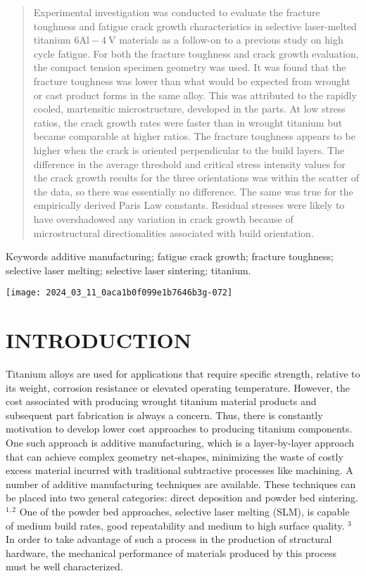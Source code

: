 \documentclass[10pt]{article}
\begin{document}
\begin{abstract}
Experimental investigation was conducted to evaluate the fracture toughness and fatigue crack growth characteristics in selective laser-melted titanium $6 \mathrm{Al}-4 \mathrm{~V}$ materials as a follow-on to a previous study on high cycle fatigue. For both the fracture toughness and crack growth evaluation, the compact tension specimen geometry was used. It was found that the fracture toughness was lower than what would be expected from wrought or cast product forms in the same alloy. This was attributed to the rapidly cooled, martensitic microstructure, developed in the parts. At low stress ratios, the crack growth rates were faster than in wrought titanium but became comparable at higher ratios. The fracture toughness appears to be higher when the crack is oriented perpendicular to the build layers. The difference in the average threshold and critical stress intensity values for the crack growth results for the three orientations was within the scatter of the data, so there was essentially no difference. The same was true for the empirically derived Paris Law constants. Residual stresses were likely to have overshadowed any variation in crack growth because of microstructural directionalities associated with build orientation.
\end{abstract}

Keywords additive manufacturing; fatigue crack growth; fracture toughness; selective laser melting; selective laser sintering; titanium.

\begin{center}
\texttt{[image: 2024\_03\_11\_0aca1b0f099e1b7646b3g-072]}
\end{center}

\section*{INTRODUCTION}
Titanium alloys are used for applications that require specific strength, relative to its weight, corrosion resistance or elevated operating temperature. However, the cost associated with producing wrought titanium material products and subsequent part fabrication is always a concern. Thus, there is constantly motivation to develop lower cost approaches to producing titanium components. One such approach is additive manufacturing, which is a layer-by-layer approach that can achieve complex geometry net-shapes, minimizing the waste of costly excess material incurred with traditional subtractive processes like machining. A number of additive manufacturing techniques are available. These techniques can be placed into two general categories: direct deposition and powder bed sintering. ${ }^{1,2}$ One of the powder bed approaches, selective laser melting (SLM), is capable of medium build rates, good repeatability and medium to high surface quality. ${ }^{3}$ In order to take advantage of such a process in the production of structural hardware, the mechanical performance of materials produced by this process must be well characterized.
\end{document}
